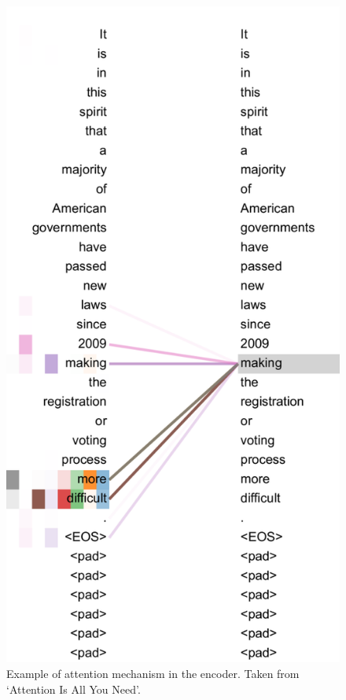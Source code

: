 \begin{figure}[H]
    \begin{minipage}{0.425\textwidth}
        \centering
        \includegraphics[width=\textwidth]{project/img/attention.png}
        \caption{Example of attention mechanism in the encoder. Taken from `Attention Is All You Need'.\cite{attention}}

\end{minipage}
\end{figure}
